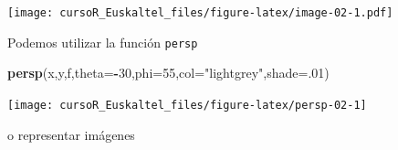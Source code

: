 \documentclass[]{book}
\newenvironment{Shaded}{\begin{snugshade}}{\end{snugshade}}
\newcommand{\KeywordTok}[1]{\textcolor[rgb]{0.13,0.29,0.53}{\textbf{#1}}}
\newcommand{\DataTypeTok}[1]{\textcolor[rgb]{0.13,0.29,0.53}{#1}}
\newcommand{\DecValTok}[1]{\textcolor[rgb]{0.00,0.00,0.81}{#1}}
\newcommand{\StringTok}[1]{\textcolor[rgb]{0.31,0.60,0.02}{#1}}
\newcommand{\OtherTok}[1]{\textcolor[rgb]{0.56,0.35,0.01}{#1}}
\newcommand{\OperatorTok}[1]{\textcolor[rgb]{0.81,0.36,0.00}{\textbf{#1}}}
\newcommand{\NormalTok}[1]{#1}
\begin{document}
\begin{Shaded}
\end{Shaded}

\texttt{[image: cursoR\_Euskaltel\_files/figure-latex/image-02-1.pdf]}

Podemos utilizar la función \texttt{persp}

\begin{Shaded}
\begin{Highlighting}[]
\KeywordTok{persp}\NormalTok{(x,y,f,}\DataTypeTok{theta=}\OperatorTok{-}\DecValTok{30}\NormalTok{,}\DataTypeTok{phi=}\DecValTok{55}\NormalTok{,}\DataTypeTok{col=}\StringTok{"lightgrey"}\NormalTok{,}\DataTypeTok{shade=}\NormalTok{.}\DecValTok{01}\NormalTok{)}
\end{Highlighting}
\end{Shaded}

\begin{center}\texttt{[image: cursoR\_Euskaltel\_files/figure-latex/persp-02-1]} \end{center}

o representar imágenes
\end{document}
